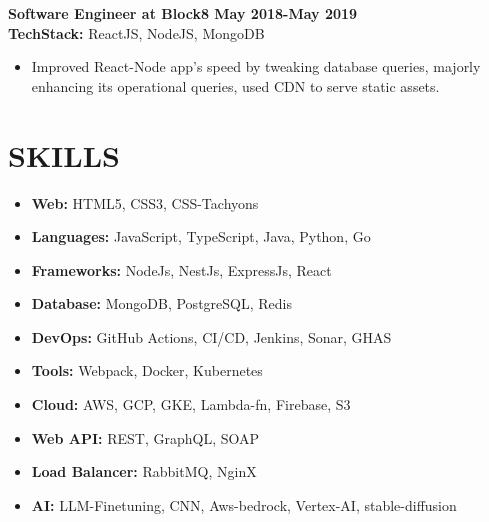 \documentclass[line, margin, 12pt]{res}
\begin{document}
\begin{resume}
\textbf{Software Engineer at Block8 \hspace{20mm} May 2018-May 2019}\\
\textbf{TechStack:} ReactJS, NodeJS, MongoDB 

\item
\begin{itemize}
\item Improved React-Node app's speed by tweaking database queries, majorly enhancing its operational queries, used CDN to serve static assets.
\end{itemize}


\section{SKILLS}
\begin{itemize}
\item \textbf{Web:} HTML5, CSS3, CSS-Tachyons
\item \textbf{Languages:} JavaScript, TypeScript, Java, Python, Go
\item \textbf{Frameworks:} NodeJs, NestJs, ExpressJs, React
\item \textbf{Database:} MongoDB, PostgreSQL, Redis
\item \textbf{DevOps:} GitHub Actions, CI/CD, Jenkins, Sonar, GHAS
\item \textbf{Tools:} Webpack, Docker, Kubernetes
\item \textbf{Cloud:} AWS, GCP, GKE, Lambda-fn, Firebase, S3
\item \textbf{Web API:} REST, GraphQL, SOAP
\item \textbf{Load Balancer:} RabbitMQ, NginX
\item \textbf{AI:} LLM-Finetuning, CNN, Aws-bedrock, Vertex-AI, stable-diffusion
\end{itemize}


\end{resume}
\end{document}
